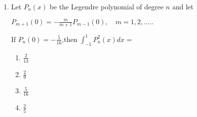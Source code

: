 \documentclass[journal]{IEEEtran}
\theoremstyle{remark}
\begin{document}
\begin{enumerate}
\begin{multicols}{4}
                \end{multicols}

                \item Let $P_n(x)$ be the Legendre polynomial of degree $n$ and let 
                \begin{center}
                     $P_{m+1}(0)=-\frac{m}{m+1}P_{m-1}(0), \quad m=1,2,.....$
                \end{center}
                If $P_n(0)=-\frac{5}{16}$,then \quad $\int_{-1}^{1}P_n^2(x)dx$ =
                \begin{multicols}{4}
                \begin{enumerate}
                    \item $\frac{2}{13}$
                    \item $\frac{2}{9}$
                    \item $\frac{5}{16}$
                    \item $\frac{2}{5}$
                \end{enumerate}
                    
                \end{multicols}
            
            \end{enumerate}
\end{document}
